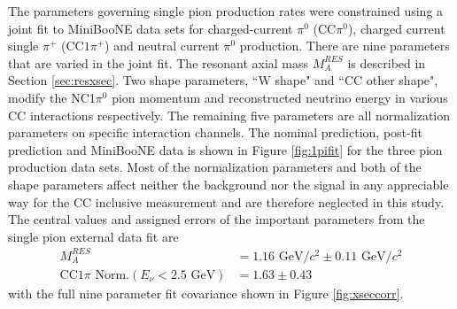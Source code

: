 The parameters governing single pion production rates were constrained using a joint fit to MiniBooNE data sets for charged-current $\pi^0$ (CC$\pi^0$), charged current single $\pi^+$ (CC$1\pi^+$) and neutral current $\pi^0$ production. There are nine parameters that are varied in the joint fit. The resonant axial mass $M_A^{RES}$ is described in Section \ref{sec:resxsec}. Two shape parameters, ``W shape" and ``CC other shape", modify the NC1$\pi^0$ pion momentum and reconstructed neutrino energy in various CC interactions respectively. The remaining five parameters are all normalization parameters on specific interaction channels. The nominal prediction, post-fit prediction and MiniBooNE data is shown in Figure \ref{fig:1pifit} for the three pion production data sets. Most of the normalization parameters and both of the shape parameters affect neither the background nor the signal in any appreciable way for the CC inclusive measurement and are therefore neglected in this study. The central values and assigned errors of the important parameters from the single pion external data fit are
\begin{align}
M_A^{RES} &= 1.16\text{~GeV/}c^2\pm 0.11\text{~GeV/}c^2\\
\text{CC}1\pi\text{~Norm.}(E_\nu < 2.5\text{~GeV}) &= 1.63\pm0.43
\end{align}
with the full nine parameter fit covariance shown in Figure \ref{fig:xseccorr}.

